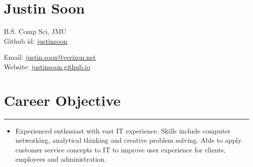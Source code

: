 \documentclass[a4paper]{article}
\author{Justin Soon}
\begin{document}
\section*{\huge\textbf Justin Soon}
\begin{minipage}{.45\linewidth}
	\begin{flushleft}
		B.S. Comp Sci, JMU\\
		Github id: \href{https://github.com/justinsoon}{justinsoon}\\
	\end{flushleft}
\end{minipage}
\hfill
\begin{minipage}{.45\linewidth}
	\begin{flushright}
		Email: \href{mailto:justin.soon@verizon.net}{justin.soon@verizon.net}\\
		Website: \href{http://justinsoon.github.io/}{justinsoon.github.io}\\
	\end{flushright}
\end{minipage}

\section*{Career Objective}
\hrule
\vspace{3mm}
\begin{itemize}
	\item Experienced enthusiast with vast IT experience. Skills include computer networking, analytical thinking and creative problem solving. Able to apply customer service concepts to IT to improve user experience for clients, employees and administration.\\
\end{itemize}

\end{document}
